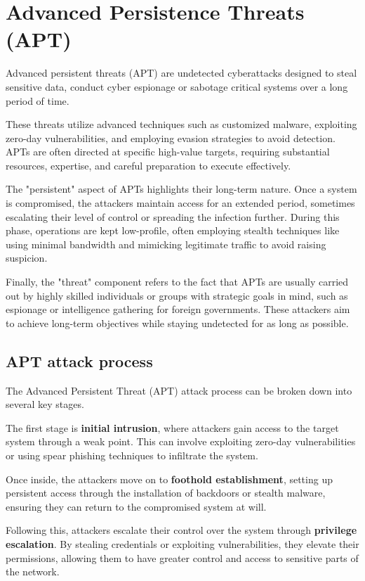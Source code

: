 \section{Advanced Persistence Threats (APT)}
\begin{boxH}
  Advanced persistent threats (APT) are undetected cyberattacks
  designed to steal sensitive data, conduct cyber espionage or
  sabotage critical systems over a long period of time.
\end{boxH}
These threats utilize advanced techniques such as customized malware,
exploiting zero-day vulnerabilities, and employing evasion strategies
to avoid detection. APTs are often directed at specific high-value
targets, requiring substantial resources, expertise, and careful
preparation to execute effectively.

The "persistent" aspect of APTs highlights their long-term nature.
Once a system is compromised, the attackers maintain access for an
extended period, sometimes escalating their level of control or
spreading the infection further. During this phase, operations are
kept low-profile, often employing stealth techniques like using
minimal bandwidth and mimicking legitimate traffic to avoid raising
suspicion.

Finally, the "threat" component refers to the fact that APTs are
usually carried out by highly skilled individuals or groups with
strategic goals in mind, such as espionage or intelligence gathering
for foreign governments. These attackers aim to achieve long-term
objectives while staying undetected for as long as possible.

\subsection{APT attack process}
The Advanced Persistent Threat (APT) attack process can be broken down
into several key stages. 

The first stage is \textbf{initial intrusion}, where attackers gain
access to the target system through a weak point. This can involve
exploiting zero-day vulnerabilities or using spear phishing techniques
to infiltrate the system.

Once inside, the attackers move on to \textbf{foothold establishment},
setting up persistent access through the installation of backdoors or
stealth malware, ensuring they can return to the compromised system at
will.

Following this, attackers escalate their control over the system
through \textbf{privilege escalation}. By stealing credentials or
exploiting vulnerabilities, they elevate their permissions, allowing
them to have greater control and access to sensitive parts of the
network.

